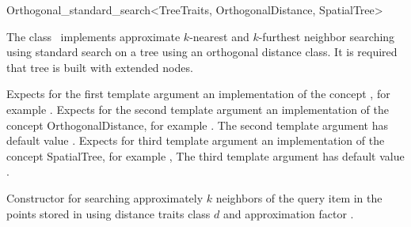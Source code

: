 

\begin{ccRefClass}{Orthogonal_standard_search<TreeTraits, OrthogonalDistance, SpatialTree>}  %


\ccDefinition

The class \ccRefName\ implements approximate $k$-nearest and $k$-furthest neighbor searching
using standard search on a  tree using an orthogonal distance
class. It is required that tree is built with extended nodes.


\ccParameters

Expects for the first template argument an implementation of the concept ,
for example .
Expects for the second template argument an implementation of the
concept OrthogonalDistance, for example .
The second template argument has default value
.
Expects for third template argument an implementation of the concept SpatialTree,
for example ,
The third template argument has default value .

\ccTypes



\ccOperations

\def\ccLongParamLayout{\ccTrue}
{Constructor for searching approximately $k$ neighbors of the query item  
in the points stored in  using 
distance
traits class $d$ and approximation factor .}


\end{ccRefClass}
